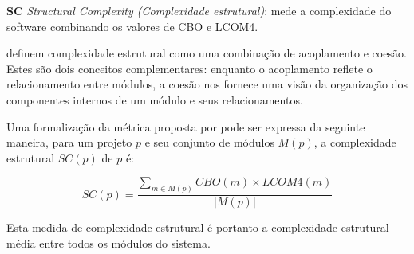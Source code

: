 {\bf SC} {\it Structural Complexity (Complexidade estrutural)}: mede a
complexidade do software \cite{Darcy2005} combinando os valores de CBO e LCOM4.

 definem complexidade estrutural como uma combinação de
acoplamento e coesão. Estes são dois conceitos complementares: enquanto o
acoplamento reflete o relacionamento entre módulos, a coesão nos fornece uma
visão da organização dos componentes internos de um módulo e seus
relacionamentos.

Uma formalização da métrica proposta por  pode ser
expressa da seguinte maneira, para um projeto $p$ e seu conjunto de módulos
$M(p)$, a complexidade estrutural $SC(p)$ de $p$ é:

\begin{equation}
SC(p) = \frac
{ \displaystyle \sum_{m \in M(p)} CBO(m) \times LCOM4(m) }
{ |M(p)| }
\end{equation}

Esta medida de complexidade estrutural é portanto a complexidade
estrutural média entre todos os módulos do sistema.

